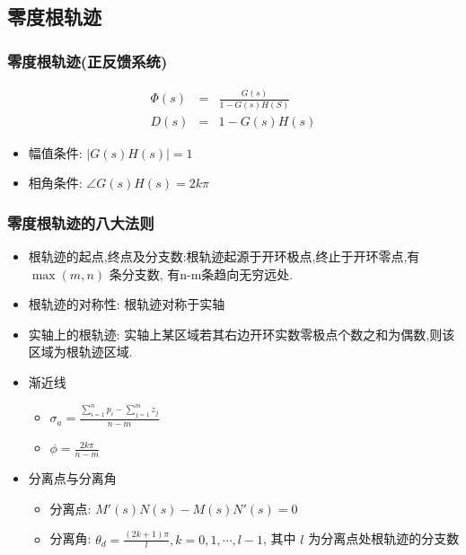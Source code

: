\documentclass{article}
\begin{document}
\subsection{零度根轨迹}
\label{sec-3-2}
\begin{frame}
\frametitle{零度根轨迹(正反馈系统)}
\label{sec-3-2-1}



\begin{eqnarray*}
\Phi(s) &= &\frac{G(s)}{1-G(s)H(S)} \\
D(s) &=& 1-G(s)H(s) 
\end{eqnarray*}

\begin{itemize}
\item <2->幅值条件: $|G(s)H(s)|=1$
\item <3->相角条件: $\angle G(s)H(s) =2k\pi$
\end{itemize}
\end{frame}
\begin{frame}
\frametitle{零度根轨迹的八大法则}
\label{sec-3-2-2}

\begin{itemize}
\item <2->根轨迹的起点,终点及分支数:根轨迹起源于开环极点,终止于开环零点,有 $\max(m,n)$ 条分支数, 有n-m条趋向无穷远处.
\item <3->根轨迹的对称性: 根轨迹对称于实轴
\item <4->实轴上的根轨迹: 实轴上某区域若其右边开环实数零极点个数之和为偶数,则该区域为根轨迹区域.
\item <5->渐近线
\begin{itemize}
\item $\sigma_a =\frac{\sum_{i=1}^n p_i -\sum_{j=1}^m z_j}{n-m}$
\item $\phi = \frac{2k\pi}{n-m}$
\end{itemize}
\item <6->分离点与分离角
\begin{itemize}
\item 分离点: $M'(s)N(s)-M(s)N'(s)=0$
\item 分离角: $\theta_d=\frac{(2k+1)\pi}{l}, k=0,1,\cdots,l-1$, 其中 $l$ 为分离点处根轨迹的分支数
\end{itemize}
\end{itemize}
\end{frame}
\end{document}
